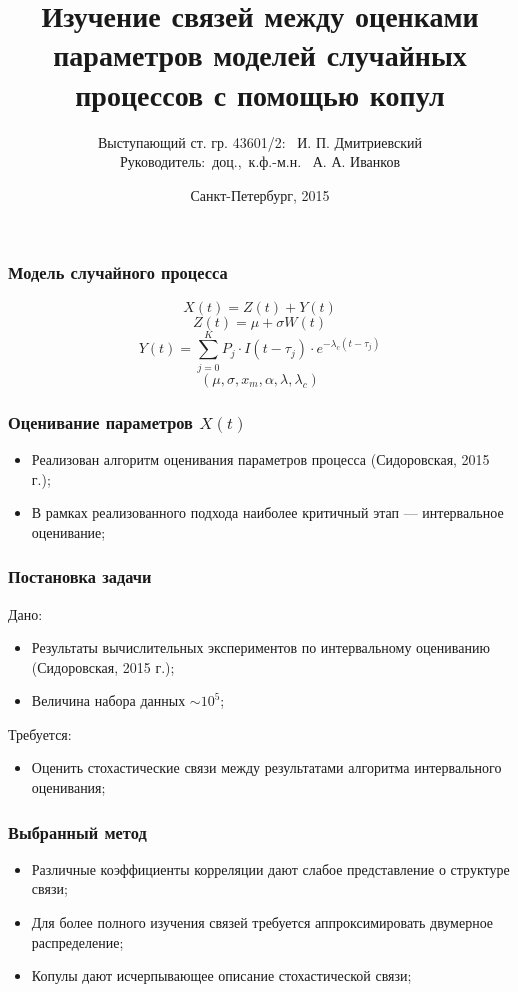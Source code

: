 \documentclass[11pt]{beamer}
\institute{\small{Институт прикладной математики и механики, СПбГПУ}}
\title{Изучение связей между оценками параметров моделей случайных процессов с помощью копул}
\author{\small{%
Выступающий ст. гр. 43601/2: \hfill ~И. П. Дмитриевский\\%
Руководитель:~доц.,~к.ф.-м.н. \hfill ~А. А. Иванков}\\%
\vfill
}
\date{\small{Санкт-Петербург, 2015}}
\begin{document}
\maketitle

\begin{frame}
\frametitle{Модель случайного процесса}
\begin{equation}
X(t) = Z(t) + Y(t)
\end{equation}
\begin{equation}
Z(t) = \mu + \sigma W(t)
\end{equation}
\begin{equation}
Y(t) = \sum_{j=0}^K P_j \cdot I(t - \tau_j) \cdot e^{-\lambda_c(t - \tau_j)}
\end{equation}
\begin{equation}
(\mu, \sigma, x_m, \alpha, \lambda, \lambda_c)
\end{equation}
\end{frame}

\begin{frame}
\frametitle{Оценивание параметров $X(t)$}
\begin{itemize}
  \item Реализован алгоритм оценивания параметров процесса (Сидоровская, 2015 г.);
  \item В рамках реализованного подхода наиболее критичный этап --- интервальное оценивание;
\end{itemize}
\end{frame}

\begin{frame}
\frametitle{Постановка задачи}
Дано:
\begin{itemize}
  \item Результаты вычислительных экспериментов по интервальному оцениванию (Сидоровская, 2015 г.);
  \item Величина набора данных $\sim 10^5$;
\end{itemize}

Требуется:
\begin{itemize}
  \item Оценить стохастические связи между результатами алгоритма интервального оценивания;
\end{itemize}
\end{frame}

\begin{frame}
\frametitle{Выбранный метод}
\begin{itemize}
  \item Различные коэффициенты корреляции дают слабое представление о структуре связи;
  \item Для более полного изучения связей требуется аппроксимировать двумерное распределение;
  \item Копулы дают исчерпывающее описание стохастической связи;
\end{itemize}
\end{frame}
\end{document}
